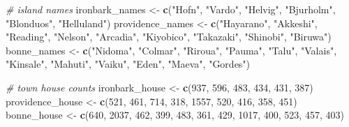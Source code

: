 \documentclass[
]{article}
\newenvironment{Shaded}{\begin{snugshade}}{\end{snugshade}}
\newcommand{\CommentTok}[1]{\textcolor[rgb]{0.56,0.35,0.01}{\textit{#1}}}
\newcommand{\DecValTok}[1]{\textcolor[rgb]{0.00,0.00,0.81}{#1}}
\newcommand{\FunctionTok}[1]{\textcolor[rgb]{0.13,0.29,0.53}{\textbf{#1}}}
\newcommand{\NormalTok}[1]{#1}
\newcommand{\OtherTok}[1]{\textcolor[rgb]{0.56,0.35,0.01}{#1}}
\newcommand{\StringTok}[1]{\textcolor[rgb]{0.31,0.60,0.02}{#1}}
\begin{document}
\begin{Shaded}
\begin{Highlighting}[]
\CommentTok{\# island names}
\NormalTok{ironbark\_names }\OtherTok{\textless{}{-}} \FunctionTok{c}\NormalTok{(}\StringTok{"Hofn"}\NormalTok{, }\StringTok{"Vardo"}\NormalTok{, }\StringTok{"Helvig"}\NormalTok{,}
                    \StringTok{"Bjurholm"}\NormalTok{, }\StringTok{"Blonduos"}\NormalTok{, }\StringTok{"Helluland"}\NormalTok{)}
\NormalTok{providence\_names }\OtherTok{\textless{}{-}} \FunctionTok{c}\NormalTok{(}\StringTok{"Hayarano"}\NormalTok{, }\StringTok{"Akkeshi"}\NormalTok{, }\StringTok{"Reading"}\NormalTok{,}
                      \StringTok{"Nelson"}\NormalTok{, }\StringTok{"Arcadia"}\NormalTok{, }\StringTok{"Kiyobico"}\NormalTok{,}
                      \StringTok{"Takazaki"}\NormalTok{, }\StringTok{"Shinobi"}\NormalTok{, }\StringTok{"Biruwa"}\NormalTok{)}
\NormalTok{bonne\_names }\OtherTok{\textless{}{-}} \FunctionTok{c}\NormalTok{(}\StringTok{"Nidoma"}\NormalTok{, }\StringTok{"Colmar"}\NormalTok{, }\StringTok{"Riroua"}\NormalTok{,}
                 \StringTok{"Pauma"}\NormalTok{, }\StringTok{"Talu"}\NormalTok{, }\StringTok{"Valais"}\NormalTok{,}
                 \StringTok{"Kinsale"}\NormalTok{, }\StringTok{"Mahuti"}\NormalTok{, }\StringTok{"Vaiku"}\NormalTok{,}
                 \StringTok{"Eden"}\NormalTok{, }\StringTok{"Maeva"}\NormalTok{, }\StringTok{"Gordes"}\NormalTok{)}

\CommentTok{\# town house counts}
\NormalTok{ironbark\_house }\OtherTok{\textless{}{-}} \FunctionTok{c}\NormalTok{(}\DecValTok{937}\NormalTok{, }\DecValTok{596}\NormalTok{, }\DecValTok{483}\NormalTok{,}
                    \DecValTok{434}\NormalTok{, }\DecValTok{431}\NormalTok{, }\DecValTok{387}\NormalTok{)}
\NormalTok{providence\_house }\OtherTok{\textless{}{-}} \FunctionTok{c}\NormalTok{(}\DecValTok{521}\NormalTok{, }\DecValTok{461}\NormalTok{, }\DecValTok{714}\NormalTok{,}
                      \DecValTok{318}\NormalTok{, }\DecValTok{1557}\NormalTok{, }\DecValTok{520}\NormalTok{,}
                      \DecValTok{416}\NormalTok{, }\DecValTok{358}\NormalTok{, }\DecValTok{451}\NormalTok{)}
\NormalTok{bonne\_house }\OtherTok{\textless{}{-}} \FunctionTok{c}\NormalTok{(}\DecValTok{640}\NormalTok{, }\DecValTok{2037}\NormalTok{, }\DecValTok{462}\NormalTok{,}
                 \DecValTok{399}\NormalTok{, }\DecValTok{483}\NormalTok{, }\DecValTok{361}\NormalTok{,}
                 \DecValTok{429}\NormalTok{, }\DecValTok{1017}\NormalTok{, }\DecValTok{400}\NormalTok{,}
                 \DecValTok{523}\NormalTok{, }\DecValTok{457}\NormalTok{, }\DecValTok{403}\NormalTok{)}


\end{Highlighting}
\end{Shaded}
\end{document}
